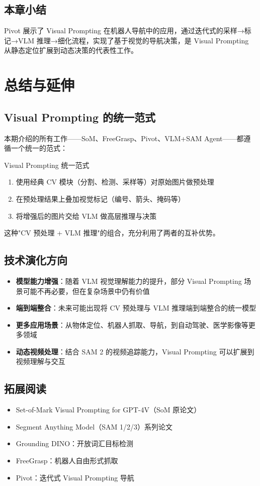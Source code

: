 \documentclass[a4paper]{article}
\begin{document}
\subsection{本章小结}

Pivot 展示了 Visual Prompting 在机器人导航中的应用，通过迭代式的采样→标记→VLM 推理→细化流程，实现了基于视觉的导航决策，是 Visual Prompting 从静态定位扩展到动态决策的代表性工作。


\section{总结与延伸}

\subsection{Visual Prompting 的统一范式}

本期介绍的所有工作——SoM、FreeGrasp、Pivot、VLM+SAM Agent——都遵循一个统一的范式：

\begin{importantbox}{Visual Prompting 统一范式}
\begin{enumerate}
    \item 使用经典 CV 模块（分割、检测、采样等）对原始图片做预处理
    \item 在预处理结果上叠加视觉标记（编号、箭头、掩码等）
    \item 将增强后的图片交给 VLM 做高层推理与决策
\end{enumerate}
这种"CV 预处理 + VLM 推理"的组合，充分利用了两者的互补优势。
\end{importantbox}

\subsection{技术演化方向}

\begin{itemize}
    \item \textbf{模型能力增强}：随着 VLM 视觉理解能力的提升，部分 Visual Prompting 场景可能不再必要，但在复杂场景中仍有价值
    \item \textbf{端到端整合}：未来可能出现将 CV 预处理与 VLM 推理端到端整合的统一模型
    \item \textbf{更多应用场景}：从物体定位、机器人抓取、导航，到自动驾驶、医学影像等更多领域
    \item \textbf{动态视频处理}：结合 SAM 2 的视频追踪能力，Visual Prompting 可以扩展到视频理解与交互
\end{itemize}

\subsection{拓展阅读}

\begin{itemize}
    \item Set-of-Mark Visual Prompting for GPT-4V（SoM 原论文）
    \item Segment Anything Model（SAM 1/2/3）系列论文
    \item Grounding DINO：开放词汇目标检测
    \item FreeGrasp：机器人自由形式抓取
    \item Pivot：迭代式 Visual Prompting 导航
\end{itemize}

\end{document}
